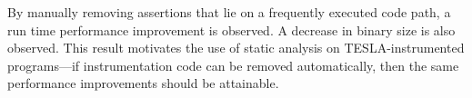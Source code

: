 By manually removing assertions that lie on a frequently executed code
path, a run time performance improvement is observed. A decrease in
binary size is also observed. This result motivates the use of static
analysis on TESLA-instrumented programs---if instrumentation code can be
removed automatically, then the same performance improvements should be
attainable.







